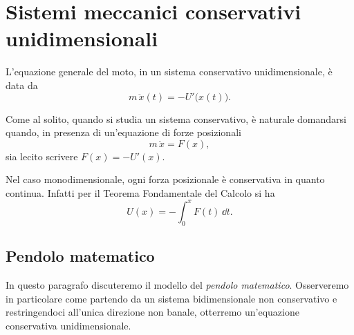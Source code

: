 \section{Sistemi meccanici conservativi unidimensionali}

L'equazione generale del moto, in un sistema conservativo unidimensionale, è data da
\[
	m\,\ddot{x}(t) = -U'\big(x(t)\big).
\]

\begin{oss}\label{oss:conservazioneUnidim}
	Come al solito, quando si studia un sistema conservativo, è naturale domandarsi quando, in presenza di un'equazione di forze posizionali
	\[
		m\,\ddot{x} = F(x),
	\]
	sia lecito scrivere \(F(x) = -U'(x)\).
	
	Nel caso monodimensionale, ogni forza posizionale è conservativa in quanto continua. Infatti per il Teorema Fondamentale del Calcolo si ha
	\[
		U(x) = -\int_0^x F(t)\,\dd t.
	\]
\end{oss}

\subsection{Pendolo matematico}

In questo paragrafo discuteremo il modello del \emph{pendolo matematico}.
Osserveremo in particolare come partendo da un sistema bidimensionale non conservativo e restringendoci all'unica direzione non banale, otterremo un'equazione conservativa unidimensionale.

